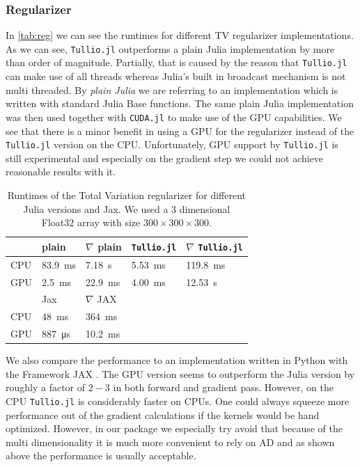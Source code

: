 \documentclass{juliacon}
\begin{document}
        \subsubsection{Regularizer}
            In \autoref{tab:reg} we can see the runtimes for different TV regularizer implementations. As we can see, \verb|Tullio.jl| outperforms a plain 
            Julia implementation by more than order of magnitude. Partially, that is caused by the reason that \verb|Tullio.jl| can make 
            use of all threads whereas Julia's built in broadcast mechanism is not multi threaded.
            By \textit{plain Julia} we are referring to an implementation which is written with standard Julia Base functions.
            The same plain Julia implementation was then used together with \verb|CUDA.jl|
            to make use of the GPU capabilities. We see that there is a minor benefit in using a GPU for the regularizer instead of 
            the \verb|Tullio.jl| version on the CPU. Unfortunately, GPU support by \verb|Tullio.jl| is still experimental and especially on the gradient step 
            we could not achieve reasonable results with it.
            \begin{table}[h]
                \begin{tabular}{l l l l l}
                    & plain & $\nabla$ plain & \verb|Tullio.jl| & $\nabla$ \verb|Tullio.jl| \\
                \hline
                CPU & \SI{83.9}{\milli\second} & \SI{7.18}{\second} & \SI{5.53}{\milli\second}  & \SI{119.8}{\milli\second}   \\ 
                GPU & \SI{2.5}{\milli\second}  & \SI{22.9}{\milli\second}& \SI{4.00}{\milli\second}  & \SI{12.53}{\second} \\
                \hline
                \hline
                    & Jax & $\nabla$ JAX && \\
                \hline
                CPU & \SI{48}{\milli\second}   & \SI{364}{\milli\second}&   & \\
                GPU & \SI{887}{\micro\second}   & \SI{10.2}{\milli\second}&   &
                \end{tabular}
                \caption{Runtimes of the Total Variation regularizer for different Julia versions and Jax. 
                    We used a 3 dimensional Float32 array with size $300 \times 300 \times 300$.  }
                \label{tab:reg}
            \end{table}
            We also compare the performance to an implementation written in Python with the Framework JAX \cite{jax2018github}. 
            The GPU version seems to outperform the Julia version by roughly a factor of $2 - 3$ in both forward and gradient pass.
            However, on the CPU \verb|Tullio.jl| is considerably faster on CPUs. 
            One could always squeeze more performance out of the gradient calculations if the kernels would be hand optimized.
            However, in our package we especially try avoid that because of the multi dimensionality it is much more convenient
            to rely on AD and as shown above the performance is usually acceptable.
\end{document}
